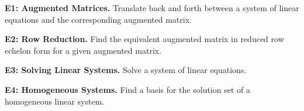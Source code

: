 

\begin{moduleStandards}
  \item \textbf{E1: Augmented Matrices.}
        Translate back and forth between a system of linear equations and
        the corresponding augmented matrix.
  \item \textbf{E2: Row Reduction.}
        Find the equivalent augmented matrix in reduced row echelon form
        for a given augmented matrix.
  \item \textbf{E3: Solving Linear Systems.}
        Solve a system of linear equations.
  \item \textbf{E4: Homogeneous Systems.}
        Find a basis for the solution set of a homogeneous linear system.
\end{moduleStandards}







